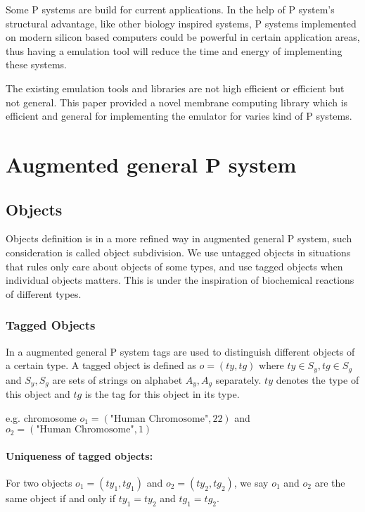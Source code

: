 \documentclass[9pt,a4paper,twoside]{article}
\begin{document}
    Some P systems are build for current applications. In the help of P system's structural advantage, like other biology inspired 
    systems, P systems implemented on modern silicon based computers could be powerful in certain application areas, thus having a emulation tool
    will reduce the time and energy of implementing these systems. 
    
    The existing emulation tools and libraries are not high efficient or efficient but not general. 
    This paper provided a novel membrane computing library which is efficient and general for implementing the emulator for varies kind of P systems.
   
    
\section{Augmented general P system}

\subsection{Objects}

    Objects definition is in a more refined way in augmented general P system, such consideration is called object subdivision. We use untagged objects in
    situations that rules only care about objects of some types, and use tagged objects when individual objects matters. This is under the inspiration of 
    biochemical reactions of different types.
\subsubsection{Tagged Objects}

        In a augmented general P system tags are used to distinguish different objects of a certain type. 
        A tagged object is defined as $o = (ty, tg)$ where $ty \in S_y, tg \in S_g$ and $S_y, S_g$ are sets of strings on alphabet $A_y, A_g$ separately. 
        $ty$ denotes the type of this object and $tg$ is the tag for this object in its type.
        
        e.g. chromosome $o_1 = (\text{"Human Chromosome"}, 22)$ 
        and $o_2 = (\text{"Human Chromosome"}, 1)$
\paragraph{Uniqueness of tagged objects:}
            
                For two objects $o_1 = (ty_1, tg_1)$ and $o_2 = (ty_2, tg_2)$, we say $o_1$ and $o_2$ are the same object if and only if 
                $ty_1 = ty_2$ and $tg_1 = tg_2$.
\end{document}
